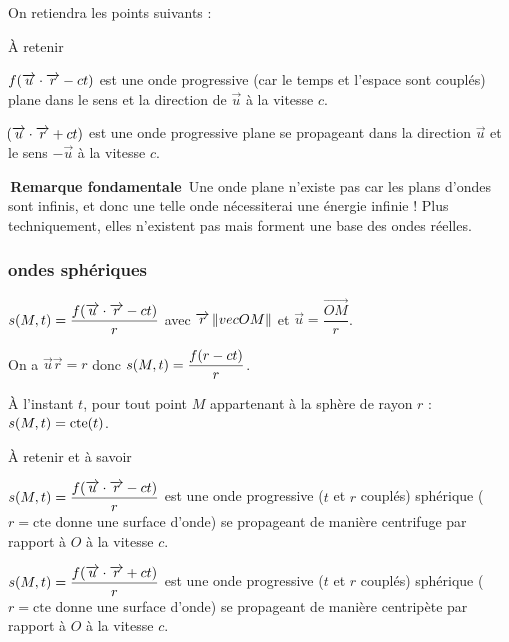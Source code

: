 \documentclass[a4paper,french,bookmarks]{book}
\begin{document}
    On retiendra les points suivants :
    
    \begin{form}{À retenir}{}
        \begin{enumerate}
            \itt $f\!\left(\overrightarrow{u} \cdot \overrightarrow{r} - ct\right)$ est une onde progressive (car le temps et l'espace sont couplés) plane dans le sens et la direction de $\vec u$ à la vitesse $c$.
            
            \itt $\!\left(\overrightarrow{u} \cdot \overrightarrow{r} + ct\right)$ est une onde progressive plane se propageant dans la direction $\vec u$ et le sens $-\vec u$ à la vitesse $c$.
            
            \itt \colorbox{colform!20}{\textnormal{\color{colform}\sffamily\bfseries \,Remarque fondamentale\,}} Une onde plane n'existe pas car les plans d'ondes sont infinis, et donc une telle onde nécessiterai une énergie infinie ! Plus techniquement, elles n'existent pas mais forment une base des ondes réelles.
        \end{enumerate}
    \end{form}

    \subsubsection{ondes sphériques}

    $s\!\left(M, t\right) = \dfrac{f\!\left(\overrightarrow{u} \cdot \overrightarrow{r} - ct\right)}{r}$ avec $\overrightarrow{r} \left\lVert vec{OM}\right\rVert$ et $\vec u = \dfrac{\vec{OM}}{r}$.
    
    On a $\vec u \vec r = r$ donc $s\!\left(M, t\right) = \dfrac{f\!\left(r - ct\right)}{r}$.
    
    À l'instant $t$, pour tout point $M$ appartenant à la sphère de rayon $r$ : \qquad\qquad $s\!\left(M, t\right) = \text{cte}\!\left(t\right)$.
    
    \begin{form}{À retenir et à savoir}{}
        \begin{enumerate}
            \itt $s\!\left(M, t\right) = \dfrac{f\!\left(\overrightarrow{u} \cdot \overrightarrow{r} - ct\right)}{r}$ est une onde progressive ($t$ et $r$ couplés) sphérique ($r = \text{cte}$ donne une surface d'onde) se propageant de manière centrifuge par rapport à $O$ à la vitesse $c$.
            
            \itt $s\!\left(M, t\right) = \dfrac{f\!\left(\overrightarrow{u} \cdot \overrightarrow{r} + ct\right)}{r}$ est une onde progressive ($t$ et $r$ couplés) sphérique ($r = \text{cte}$ donne une surface d'onde) se propageant de manière centripète par rapport à $O$ à la vitesse $c$.
        \end{enumerate}
    \end{form}
    
\end{document}
